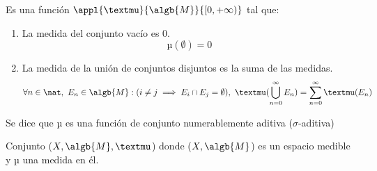 \documentclass{apuntes}
\begin{document}
\begin{defn}
Es una función $\appl{µ}{\algb{M}}{[0, +\infty)}$ tal que:
\begin{enumerate}
\item La medida del conjunto vacío es 0.
\[µ(\emptyset)=0\]
\item La medida de la unión de conjuntos disjuntos es la suma de las medidas.
\[\forall n \in  \nat, \ E_n \in \algb{M}: (i\neq j \implies E_i\cap E_j = \emptyset), \ µ(\bigcup_{n=0}^{\infty}E_n)=\sum_{n=0}^{\infty}µ(E_n)\]
\end{enumerate}

Se dice que µ es una función de conjunto numerablemente aditiva ($\sigma$-aditiva)
\end{defn}

\begin{defn}
Conjunto ($X, \algb{M}, µ$) donde ($X, \algb{M}$) es un espacio medible y µ una medida en él.
\end{defn}
\end{document}
